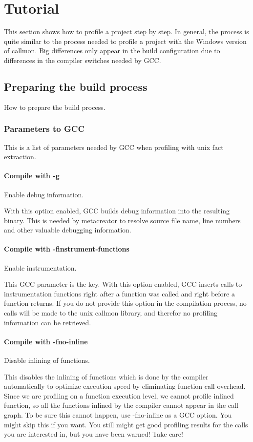 \section{Tutorial}
\label{sec:Tutorial}
This section shows how to profile a project step by step. In general, the process is quite similar to the process needed to profile a project with the Windows version of callmon. Big differences only appear in the build configuration due to differences in the compiler switches needed by GCC.

\subsection{Preparing the build process} How to prepare the build process.

\subsubsection{Parameters to GCC} This is a list of parameters needed by GCC when profiling with unix fact extraction.

\paragraph{Compile with -g} Enable debug information.

With this option enabled, GCC builds debug information into the resulting binary. This is needed by metacreator to resolve source file name, line numbers and other valuable debugging information.

\paragraph{Compile with -finstrument-functions} Enable instrumentation.

This GCC parameter is the key. With this option enabled, GCC inserts calls to instrumentation functions right after a function was called and right before a function returns. If you do not provide this option in the compilation process, no calls will be made to the unix callmon library, and therefor no profiling information can be retrieved.

\paragraph{Compile with -fno-inline} Disable inlining of functions.

This disables the inlining of functions which is done by the compiler automatically to optimize execution speed by eliminating function call overhead. Since we are profiling on a function execution level, we cannot profile inlined function, so all the functions inlined by the compiler cannot appear in the call graph. To be sure this cannot happen, use -fno-inline as a GCC option. You might skip this if you want. You still might get good profiling results for the calls you are interested in, but you have been warned! Take care!

